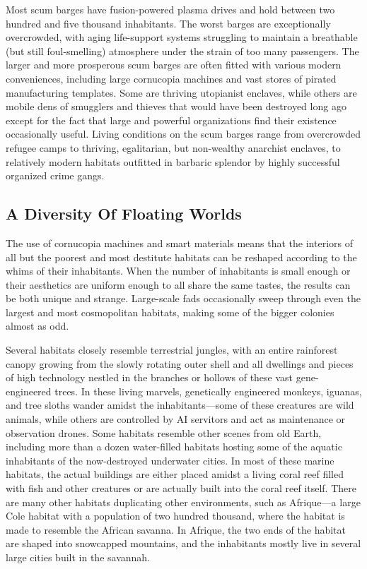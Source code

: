 Most scum barges have fusion-powered plasma 
drives and hold between two hundred and five 
thousand inhabitants. The worst barges are exceptionally overcrowded, with aging life-support systems struggling to maintain a breathable (but still 
foul-smelling) atmosphere under the strain of too 
many passengers. The larger and more prosperous 
scum barges are often fitted with various modern 
conveniences, including large cornucopia machines 
and vast stores of pirated manufacturing templates. 
Some are thriving utopianist enclaves, while others 
are mobile dens of smugglers and thieves that would 
have been destroyed long ago except for the fact that 
large and powerful organizations find their existence 
occasionally useful. Living conditions on the scum 
barges range from overcrowded refugee camps to 
thriving, egalitarian, but non-wealthy anarchist 
enclaves, to relatively modern habitats outfitted in 
barbaric splendor by highly successful organized 
crime gangs.

\subsection{A Diversity Of Floating Worlds}

The use of cornucopia machines and smart materials 
means that the interiors of all but the poorest and 
most destitute habitats can be reshaped according 
to the whims of their inhabitants. When the number 
of inhabitants is small enough or their aesthetics are 
uniform enough to all share the same tastes, the results can be both unique and strange. Large-scale fads 
occasionally sweep through even the largest and most 
cosmopolitan habitats, making some of the bigger 
colonies almost as odd.

Several habitats closely resemble terrestrial jungles, 
with an entire rainforest canopy growing from the 
slowly rotating outer shell and all dwellings and 
pieces of high technology nestled in the branches 
or hollows of these vast gene-engineered trees. In 
these living marvels, genetically engineered monkeys, 
iguanas, and tree sloths wander amidst the inhabitants—some of these creatures are wild animals, 
while others are controlled by AI servitors and act 
as maintenance or observation drones. Some habitats resemble other scenes from old Earth, including 
more than a dozen water-filled habitats hosting some 
of the aquatic inhabitants of the now-destroyed 
underwater cities. In most of these marine habitats, 
the actual buildings are either placed amidst a living 
coral reef filled with fish and other creatures or are 
actually built into the coral reef itself. There are 
many other habitats duplicating other environments, 
such as Afrique—a large Cole habitat with a population of two hundred thousand, where the habitat is 
made to resemble the African savanna. In Afrique, 
the two ends of the habitat are shaped into snowcapped mountains, and the inhabitants mostly live in 
several large cities built in the savannah.

